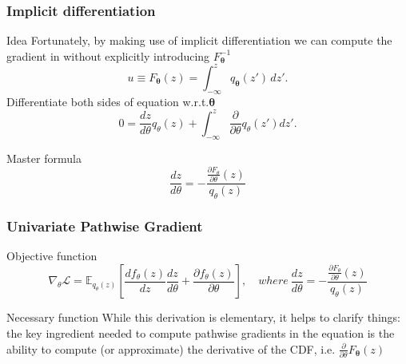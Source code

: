 \documentclass{beamer}
\begin{document}
\begin{frame}
    \frametitle{Implicit differentiation}
    \begin{block}{Idea}
    Fortunately, by making use of implicit differentiation we
can compute the gradient in without explicitly introducing $F_\mathbf{\theta}^{-1}$
$$u \equiv F_{\mathbf{\theta}}(z) = \int_{-\infty}^{z} q_{\mathbf{\theta}}(z') \, dz'.$$
Differentiate both sides of equation  w.r.t.$\mathbf{\theta}$
$$0 = \frac{dz}{d\theta} q_{\theta}(z) + \int_{-\infty}^{z} \frac{\partial}{\partial \theta} q_{\theta}(z') dz'.$$
    \end{block}

    \begin{block}{Master formula}
    $$\frac{dz}{d\theta} = -\frac{\frac{\partial F_\theta}{\partial \theta}(z)}{q_\theta(z)}$$

    \end{block}
\end{frame}
\begin{frame}
    \frametitle{Univariate Pathwise Gradient}
    \begin{block}{Objective function}
$$\nabla_{\theta} \mathcal{L} = \mathbb{E}_{q_{\theta}(z)} \left[ \frac{d f_{\theta}(z)}{dz} \frac{dz}{d\theta} + \frac{\partial f_{\theta}(z)}{\partial \theta} \right], \quad where~\frac{dz}{d\theta} = -\frac{\frac{\partial F_\theta}{\partial \theta}(z)}{q_\theta(z)}$$

    \end{block}

    \begin{block}{Necessary function}
    While this derivation is elementary, it helps to clarify things: the key ingredient needed to compute pathwise gradients
in the equation is the ability to compute (or approximate) the
derivative of the CDF, i.e. $\frac{\partial}{\partial\theta} F_\mathbf{\theta}(z)$
    \end{block}
\end{frame}
\end{document}
